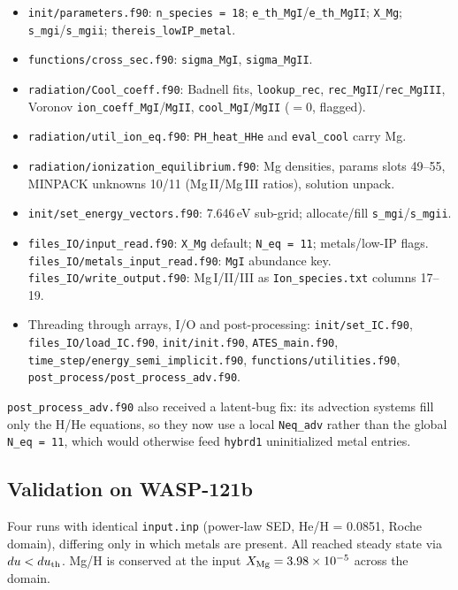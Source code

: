 \documentclass[english,a4paper]{kiseon_memo}
\begin{document}
{\sloppy
\begin{itemize}
\item \texttt{init/parameters.f90}: \verb|n_species = 18|;
  \verb|e_th_MgI|/\verb|e_th_MgII|; \verb|X_Mg|; \verb|s_mgi|/\verb|s_mgii|;
  \verb|thereis_lowIP_metal|.
\item \texttt{functions/cross\_sec.f90}: \verb|sigma_MgI|, \verb|sigma_MgII|.
\item \texttt{radiation/Cool\_coeff.f90}: Badnell fits, \verb|lookup_rec|,
  \verb|rec_MgII|/\verb|rec_MgIII|, Voronov \verb|ion_coeff_MgI|/\verb|MgII|,
  \verb|cool_MgI|/\verb|MgII| ($=0$, flagged).
\item \texttt{radiation/util\_ion\_eq.f90}: \verb|PH_heat_HHe| and
  \verb|eval_cool| carry Mg.
\item \texttt{radiation/ionization\_equilibrium.f90}: Mg densities, params slots
  49--55, MINPACK unknowns 10/11 (Mg\,II/Mg\,III ratios), solution unpack.
\item \texttt{init/set\_energy\_vectors.f90}: 7.646\,eV sub-grid; allocate/fill
  \verb|s_mgi|/\verb|s_mgii|.
\item \texttt{files\_IO/input\_read.f90}: \verb|X_Mg| default; \verb|N_eq = 11|;
  metals/low-IP flags. \texttt{files\_IO/metals\_input\_read.f90}: \verb|MgI|
  abundance key. \texttt{files\_IO/write\_output.f90}: Mg\,I/II/III as
  \texttt{Ion\_species.txt} columns 17--19.
\item Threading through arrays, I/O and post-processing:
  \texttt{init/set\_IC.f90}, \texttt{files\_IO/load\_IC.f90},
  \texttt{init/init.f90}, \texttt{ATES\_main.f90},
  \texttt{time\_step/energy\_semi\_implicit.f90},
  \texttt{functions/utilities.f90},
  \texttt{post\_process/post\_process\_adv.f90}.
\end{itemize}
}

\noindent\texttt{post\_process\_adv.f90} also received a latent-bug fix: its
advection systems fill only the H/He equations, so they now use a local
\verb|Neq_adv| rather than the global \verb|N_eq = 11|, which would otherwise
feed \verb|hybrd1| uninitialized metal entries.

\subsection{Validation on WASP-121b}

Four runs with identical \texttt{input.inp} (power-law SED, He/H = 0.0851, Roche
domain), differing only in which metals are present. All reached steady state via
$du<du_{\rm th}$. Mg/H is conserved at the input $X_{\rm Mg}=3.98\times10^{-5}$
across the domain.
\end{document}
